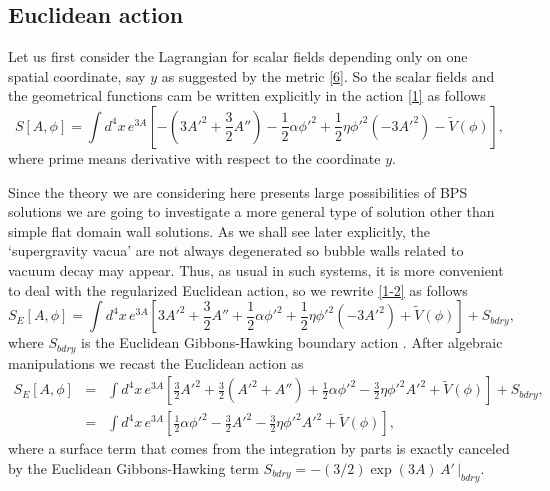 \documentclass[aps,12pt, a4paper,nofootinbib]{revtex4}
\begin{document}
{\subsection{Euclidean action}

Let us first consider the Lagrangian for scalar fields depending only on one spatial coordinate, say $y$ as suggested by the metric \eqref{6}. So the scalar fields and the geometrical functions cam be written explicitly in the action \eqref{1} as follows
\begin{equation}
S[A,\phi]=\int{d^{4}x\,e^{3A}\left[ -\left(3A'^2+\frac32A''\right)-\frac{1}{2}\alpha\phi'^2+\frac12\eta\phi'^2(-3A'^2)-\tilde{V}(\phi)\right]},\label{1-2}
\end{equation}
where prime means derivative with respect to the coordinate  $y$. 

Since the theory we are considering here presents large possibilities of  BPS solutions we are going to investigate a more general type of solution other than simple flat domain wall solutions. As we shall see later explicitly, the `supergravity vacua' are not always degenerated so bubble walls related to vacuum decay may appear. Thus, as usual in such  systems, it is more convenient to deal with the regularized Euclidean action, so we rewrite \eqref{1-2} as follows
\begin{equation}
S_E[A,\phi]=\int{d^{4}x\,e^{3A}\left[ 3A'^2+\frac32A''+\frac{1}{2}\alpha\phi'^2+\frac12\eta\phi'^2(-3A'^2)+\tilde{V}(\phi)\right]}+S_{bdry},\label{SE}
\end{equation}
where $S_{bdry}$ is the Euclidean Gibbons-Hawking boundary action \cite{Masoumi:2016pqb}. After algebraic manipulations we recast the Euclidean action as
\begin{eqnarray}
S_E[A,\phi]&=&
\int d^{4}x\, e^{3A}\left[ \frac32A'^2+\frac32(A'^2+A'')+\frac{1}{2}\alpha\phi'^2
-\frac32\eta\phi'^2A'^2+\tilde{V}(\phi)\right] +S_{bdry},\nonumber\\
&=&\int d^{4}x\, e^{3A}\left[ \frac{1}{2}\alpha\phi'^2 -\frac32A'^2
-\frac32\eta\phi'^2A'^2+\tilde{V}(\phi)\right],\label{SE2} 
\end{eqnarray}
where a surface term that comes from the integration by parts  is exactly canceled by the Euclidean Gibbons-Hawking term $S_{bdry}=-(3/2)\exp{(3A)}\,A'\,|_{bdry}$. 

}
\end{document}
